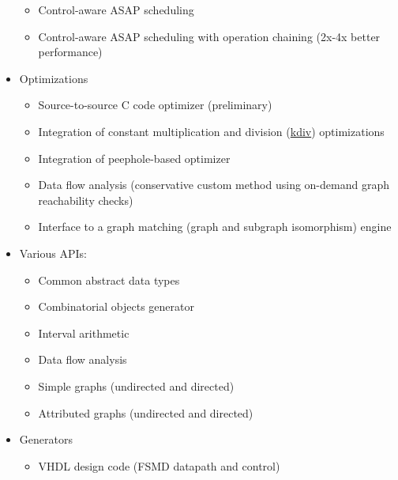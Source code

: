 \documentclass[a4paper]{article}
\begin{document}
\begin{itemize}
\begin{itemize}
\item Control-aware ASAP scheduling

\item Control-aware ASAP scheduling with operation chaining (2x-4x better
performance)

\end{itemize}

\item Optimizations
%
\begin{itemize}

\item Source-to-source C code optimizer (preliminary)

\item Integration of constant multiplication and division (\href{http://sourceforge.net/projects/kdiv}{kdiv}) optimizations

\item Integration of peephole-based optimizer

\item Data flow analysis (conservative custom method using on-demand graph
reachability checks)

\item Interface to a graph matching (graph and subgraph isomorphism) engine

\end{itemize}

\item Various APIs:
%
\begin{itemize}

\item Common abstract data types

\item Combinatorial objects generator

\item Interval arithmetic

\item Data flow analysis

\item Simple graphs (undirected and directed)

\item Attributed graphs (undirected and directed)

\end{itemize}

\item Generators
%
\begin{itemize}

\item VHDL design code (FSMD datapath and control)


\end{itemize}
\end{itemize}
\end{document}
